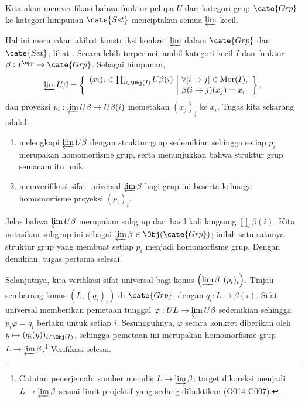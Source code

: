 \begin{contoh}\label{eg:Grp-Set-create}
	Kita akan memverifikasi bahwa funktor pelupa $U$ dari kategori grup
	$\cate{Grp}$ ke kategori himpunan $\cate{Set}$ menciptakan semua
	$\varprojlim$ kecil.

	Hal ini merupakan akibat konstruksi konkret $\varprojlim$ dalam
	$\cate{Grp}$ dan $\cate{Set}$; lihat
	\cite[Contoh 2.7.5 dan 2.8.7]{Li1}. Secara lebih terperinci, ambil kategori
	kecil $I$ dan funktor $\beta: I^{\opp} \to \cate{Grp}$. Sebagai himpunan,
	\[ \varprojlim U\beta = \left\{\begin{array}{r|l}
		(x_i)_i \in \prod_{i \in \Obj(I)} U\beta(i) & \forall [i \to j] \in \mathrm{Mor}(I), \\
		& \beta(i \to j)(x_j) = x_i
	\end{array}\right\}, \]
	dan proyeksi $p_i: \varprojlim U\beta \to U\beta(i)$ memetakan $(x_j)_j$
	ke $x_i$. Tugas kita sekarang adalah:
	\begin{enumerate}
		\item melengkapi $\varprojlim U\beta$ dengan struktur grup sedemikian
		sehingga setiap $p_i$ merupakan homomorfisme grup, serta menunjukkan bahwa
		struktur grup semacam itu unik;
		\item memverifikasi sifat universal $\varprojlim \beta$ bagi grup ini
		beserta keluarga homomorfisme proyeksi $(p_i)_i$.
	\end{enumerate}

	Jelas bahwa $\varprojlim U\beta$ merupakan subgrup dari hasil kali langsung
	$\prod_i \beta(i)$. Kita notasikan subgrup ini sebagai
	$\varprojlim \beta \in \Obj(\cate{Grp})$; inilah satu-satunya struktur grup
	yang membuat setiap $p_i$ menjadi homomorfisme grup. Dengan demikian, tugas
	pertama selesai.

	Selanjutnya, kita verifikasi sifat universal bagi konus
	$\left( \varprojlim \beta, (p_i)_i\right)$. Tinjau sembarang konus
	$(L, (q_i)_i)$ di $\cate{Grp}$, dengan $q_i: L \to \beta(i)$. Sifat
	universal memberikan pemetaan tunggal
	$\varphi: UL \to \varprojlim U\beta$ sedemikian sehingga
	$p_i \varphi = q_i$ berlaku untuk setiap $i$. Sesungguhnya, $\varphi$ secara konkret
	diberikan oleh $y \mapsto (q_i(y))_{i \in \Obj(I)}$, sehingga pemetaan ini
	merupakan homomorfisme grup $L \to \varprojlim \beta$.\footnote{Catatan
	penerjemah: sumber menulis $L \to \varinjlim \beta$; target dikoreksi
	menjadi $L \to \varprojlim \beta$ sesuai limit projektif yang sedang
	dibuktikan (O014-C007).} Verifikasi selesai.
\end{contoh}

